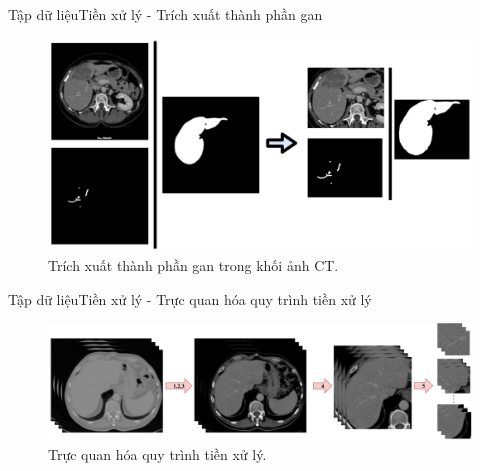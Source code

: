 \documentclass[
	10pt,                %
	aspectratio=169,     %
]{beamer}
\begin{document}
	\begin{frame}{Tập dữ liệu}{Tiền xử lý - Trích xuất thành phần gan}
	    \begin{figure}[h!]
			\includegraphics[height=.7\textheight]{figures/dataset/extract_liver.pdf}
			\vspace{-2mm}
			\caption{Trích xuất thành phần gan trong khối ảnh CT.}
		\end{figure}
	\end{frame}
	
	\begin{frame}{Tập dữ liệu}{Tiền xử lý - Trực quan hóa quy trình tiền xử lý}
	    \begin{figure}[h!]
			\includegraphics[scale=0.45]{Presentation_template/figures/dataset/preprocess_stage.pdf}
			\vspace{-2mm}
			\caption{Trực quan hóa quy trình tiền xử lý.}
		\end{figure}
	\end{frame}
\end{document}
